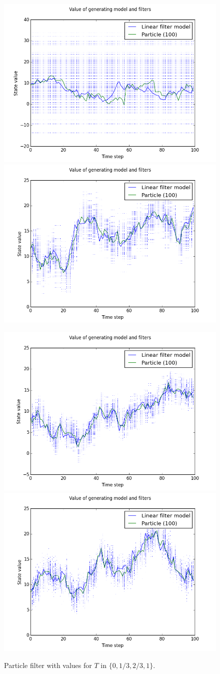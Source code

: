 \documentclass[paper=a4, fontsize=11pt]{scrartcl} %
\numberwithin{equation}{section} %
\numberwithin{figure}{section} %
\numberwithin{table}{section} %
\begin{document}
\begin{figure}
\centerline{
\includegraphics[width=.7\textwidth]{fig/figure_5}
\includegraphics[width=.7\textwidth]{fig/figure_6}}
\centerline{
\includegraphics[width=.7\textwidth]{fig/figure_7}
\includegraphics[width=.7\textwidth]{fig/figure_8}}
\caption{Particle filter with values for $T$ in $\{0, 1/3, 2/3, 1\}$.}\label{fig:3}
\end{figure}
\end{document}
